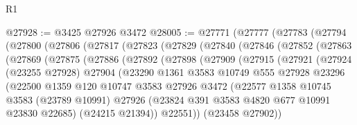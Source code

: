 \begin{lexlean}{R1}
\begin{coremodule}
@27928 := @3425 @27926 @3472
@28005 := @27771
    (@27777
      (@27783
        (@27794
          (@27800
            (@27806
              (@27817
                (@27823
                  (@27829
                    (@27840
                      (@27846
                        (@27852
                          (@27863
                            (@27869
                              (@27875
                                (@27886
                                  (@27892
                                    (@27898
                                      (@27909
                                        (@27915
                                          (@27921
                                            (@27924
                                              (@23255 @27928)
                                              @27904
                                              (@23290
                                                @1361
                                                @3583
                                                @10749
                                                @555
                                                @27928
                                                @23296
                                                (@22500
                                                  @1359
                                                  @120
                                                  @10747
                                                  @3583
                                                  @27926
                                                  @3472
                                                  (@22577
                                                    @1358
                                                    @10745
                                                    @3583
                                                    (@23789 @10991)
                                                    @27926
                                                    (@23824
                                                      @391
                                                      @3583
                                                      @4820
                                                      @677
                                                      @10991
                                                      @23830
                                                      @22685)
                                                    (@24215 @21394))
                                                  @22551))
                                              (@23458 @27902))

\end{coremodule}
\end{lexlean}
